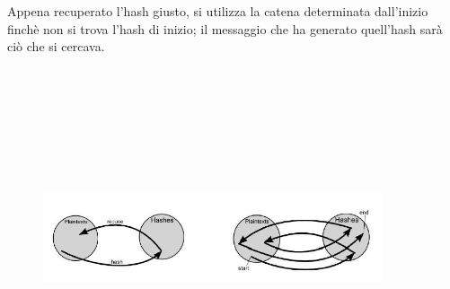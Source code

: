 Appena recuperato l'hash giusto, si utilizza la catena determinata dall'inizio finchè non si trova l'hash di inizio; il messaggio che ha generato quell'hash sarà ciò che si cercava.
\begin{figure}
	\begin{center}
	{\includegraphics[height=10cm, width=10cm, keepaspectratio]{Immagini/Capitolo4/riduzione.JPG}}
	\end{center}
\end{figure}